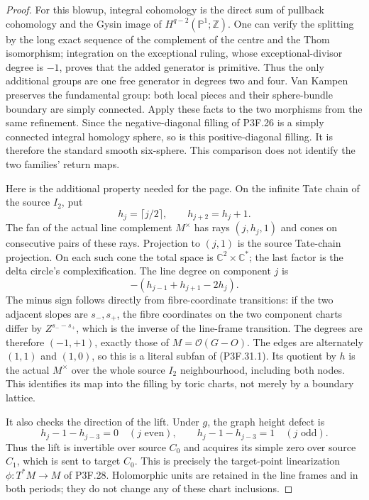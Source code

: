 \begin{proof}
For this blowup, integral cohomology is the direct sum of pullback cohomology and the Gysin image of \(H^{q-2}(\mathbb P^1;\mathbb Z)\). One can verify the splitting by the long exact sequence of the complement of the centre and the Thom isomorphism; integration on the exceptional ruling, whose exceptional-divisor degree is \(-1\), proves that the added generator is primitive. Thus the only additional groups are one free generator in degrees two and four. Van Kampen preserves the fundamental group: both local pieces and their sphere-bundle boundary are simply connected. Apply these facts to the two morphisms from the same refinement. Since the negative-diagonal filling of P3F.26 is a simply connected integral homology sphere, so is this positive-diagonal filling. It is therefore the standard smooth six-sphere. This comparison does not identify the two families' return maps.

Here is the additional property needed for the page. On the infinite Tate chain of the source \(I_2\), put \[
 h_j=\lceil j/2\rceil,
 \qquad h_{j+2}=h_j+1.
\] The fan of the actual line complement \(M^\times\) has rays \((j,h_j,1)\) and cones on consecutive pairs of these rays. Projection to \((j,1)\) is the source Tate-chain projection. On each such cone the total space is \(\mathbb C^2\times\mathbb C^*\); the last factor is the delta circle's complexification. The line degree on component \(j\) is \[
 -(h_{j-1}+h_{j+1}-2h_j).
\] The minus sign follows directly from fibre-coordinate transitions: if the two adjacent slopes are \(s_-,s_+\), the fibre coordinates on the two component charts differ by \(Z^{s_--s_+}\), which is the inverse of the line-frame transition. The degrees are therefore \((-1,+1)\), exactly those of \(M=\mathcal O(G-O)\). The edges are alternately \((1,1)\) and \((1,0)\), so this is a literal subfan of (P3F.31.1). Its quotient by \(h\) is the actual \(M^\times\) over the whole source \(I_2\) neighbourhood, including both nodes. This identifies its map into the filling by toric charts, not merely by a boundary lattice.

It also checks the direction of the lift. Under \(g\), the graph height defect is \[
 h_j-1-h_{j-3}=0\quad(j\text{ even}),\qquad
 h_j-1-h_{j-3}=1\quad(j\text{ odd}).
\] Thus the lift is invertible over source \(C_0\) and acquires its simple zero over source \(C_1\), which is sent to target \(C_0\). This is precisely the target-point linearization \(\phi:T^*M\to M\) of P3F.28. Holomorphic units are retained in the line frames and in both periods; they do not change any of these chart inclusions.


\end{proof}
